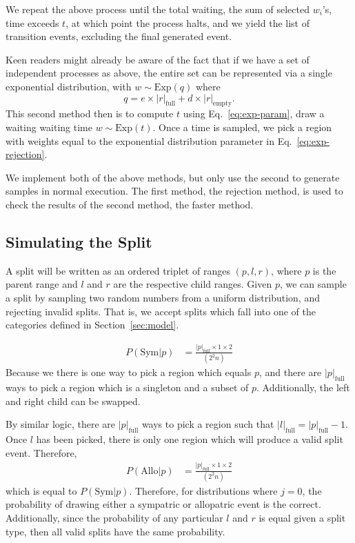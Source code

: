 \documentclass[a4paper]{article}
\newcommand{\CountFull}[1]{|#1|_\text{full}}
\newcommand{\CountEmpty}[1]{|#1|_\text{empty}}
\begin{document}
We repeat the above process until the total waiting, the sum of selected $w_i$'s, time exceeds $t$, at which point the
process halts, and we yield the list of transition events, excluding the final generated event.

Keen readers might already be aware of the fact that if we have a set of independent processes as above, the entire set
can be represented via a single exponential distribution, with \(w \sim \text{Exp}(q) \) where
\begin{equation}
	\label{eq:exp-param} q = e \times \CountFull{r} + d \times \CountEmpty{r}.
\end{equation}
This second method then is to compute \( t \) using Eq.~\ref{eq:exp-param}, draw a waiting waiting time \( w \sim
\text{Exp}(t) \).
Once a time is sampled, we pick a region with weights equal to the exponential distribution parameter in
Eq.~\ref{eq:exp-rejection}.

We implement both of the above methods, but only use the second to generate samples in normal execution.
The first method, the rejection method, is used to check the results of the second method, the faster method.

\subsection{Simulating the Split}

A split will be written as an ordered triplet of ranges \( (p,l,r) \), where $p$ is the parent range and $l$ and $r$ are
the respective child ranges. 
Given $p$, we can sample a split by sampling two random numbers from a uniform distribution, and rejecting invalid
splits.
That is, we accept splits which fall into one of the categories defined in Section~\ref{sec:model}.

\begin{align}
  P(\text{Sym} | p) &= \frac{\CountFull{p} \times 1 \times 2}{(2^2n)}
\end{align}
Because we there is one way to pick a region which equals $p$, and there are $\CountFull{p}$ ways to pick a region which
is a singleton and a subset of $p$. Additionally, the left and right child can be swapped.

By similar logic, there are $\CountFull{p}$ ways to pick a region such that $\CountFull{l} = \CountFull{p} - 1$. 
Once $l$ has been picked, there is only one region which will produce a valid split event.
Therefore, 
\begin{align}
  P(\text{Allo} | p) &= \frac{\CountFull{p} \times 1 \times 2}{(2^2n)}
\end{align}
which is equal to $P(\text{Sym} | p)$.
Therefore, for distributions where $j = 0$, the probability of drawing either a sympatric or allopatric event is the
correct.
Additionally, since the probability of any particular $l$ and $r$ is equal given a split type, then all valid splits
have the same probability.
\end{document}
